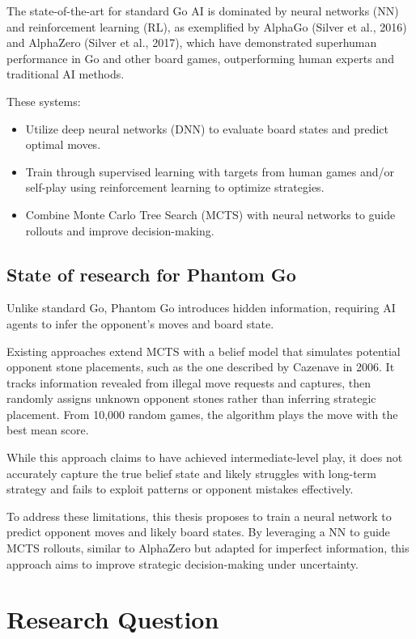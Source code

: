 \documentclass[12pt,oneside,openright]{article}
\begin{document}
The state-of-the-art for standard Go AI is dominated by neural networks (NN) and reinforcement learning (RL), as exemplified by AlphaGo (Silver et al., 2016)\cite{Silver2016} and AlphaZero (Silver et al., 2017)\cite{Silver2017}, which have demonstrated superhuman performance in Go and other board games, outperforming human experts and traditional AI methods.

These systems:
\begin{itemize}
    \item Utilize deep neural networks (DNN) to evaluate board states and predict optimal moves.
    \item Train through supervised learning with targets from human games and/or self-play using reinforcement learning to optimize strategies.
    \item Combine Monte Carlo Tree Search (MCTS) with neural networks to guide rollouts and improve decision-making.
\end{itemize}

\subsection{State of research for Phantom Go}

Unlike standard Go, Phantom Go introduces hidden information, requiring AI agents to infer the opponent’s moves and board state.

Existing approaches extend MCTS with a belief model that simulates potential opponent stone placements, such as the one described by Cazenave in 2006\cite{Cazenave2006}.
It tracks information revealed from illegal move requests and captures, then randomly assigns unknown opponent stones rather than inferring strategic placement. From 10,000 random games, the algorithm plays the move with the best mean score.

While this approach claims to have achieved intermediate-level play, it does not accurately capture the true belief state and likely struggles with long-term strategy and fails to exploit patterns or opponent mistakes effectively.

To address these limitations, this thesis proposes to train a neural network to predict opponent moves and likely board states. By leveraging a NN to guide MCTS rollouts, similar to AlphaZero but adapted for imperfect information, this approach aims to improve strategic decision-making under uncertainty.

\section{Research Question}
\end{document}
